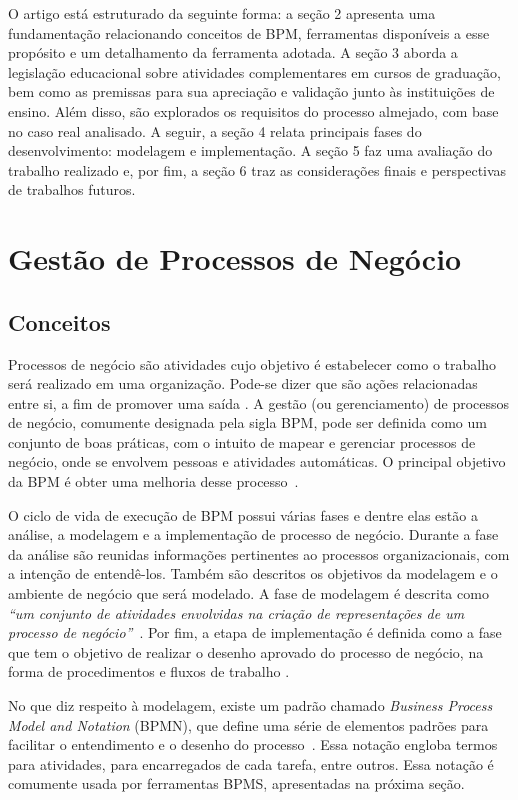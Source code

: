 \documentclass[12pt]{article}
\begin{document}
O artigo está estruturado da seguinte forma: a seção 2 apresenta uma fundamentação relacionando conceitos de BPM, ferramentas disponíveis a esse propósito e um detalhamento da ferramenta adotada. A seção 3 aborda a legislação educacional sobre atividades complementares em cursos de graduação, bem como as premissas para sua apreciação e validação junto às instituições de ensino. Além disso, são explorados os requisitos do processo almejado, com base no caso real analisado. A seguir, a seção 4 relata principais fases do desenvolvimento: modelagem e implementação. A seção 5 faz uma avaliação do trabalho realizado e, por fim, a seção 6 traz as considerações finais e perspectivas de trabalhos futuros.


\section{Gestão de Processos de Negócio}

\subsection{Conceitos}

Processos de negócio são atividades cujo objetivo é estabelecer como o trabalho será realizado em uma organização. Pode-se dizer que são ações relacionadas entre si, a fim de promover uma saída \cite{ABPMP}. A gestão (ou gerenciamento) de processos de negócio, comumente designada pela sigla BPM, pode ser definida como um conjunto de boas práticas, com o intuito de mapear e gerenciar processos de negócio, onde se envolvem pessoas e atividades automáticas. O principal objetivo da BPM é obter uma melhoria desse processo~\cite{weske}.

O ciclo de vida de execução de BPM possui várias fases e dentre elas estão a análise, a modelagem e a implementação de processo de negócio. Durante a fase da análise são reunidas informações pertinentes ao processos organizacionais, com a intenção de entendê-los. Também são descritos os objetivos da modelagem e o ambiente de negócio que será modelado. A fase de modelagem é descrita como \emph{“um conjunto de atividades envolvidas na criação de representações de um processo de negócio”}~\cite{ABPMP}. Por fim, a etapa de implementação é definida como a fase que tem o objetivo de realizar o desenho aprovado do processo de negócio, na forma de procedimentos e fluxos de trabalho \cite{ABPMP}.

	No que diz respeito à modelagem, existe um padrão chamado \emph{Business Process Model and Notation} (BPMN), que define  uma série de elementos padrões para facilitar o entendimento e o desenho do processo~\cite{BPMN}. Essa notação engloba termos para atividades, para encarregados de cada tarefa, entre outros. Essa notação é comumente usada por ferramentas BPMS, apresentadas na próxima seção.
\end{document}
